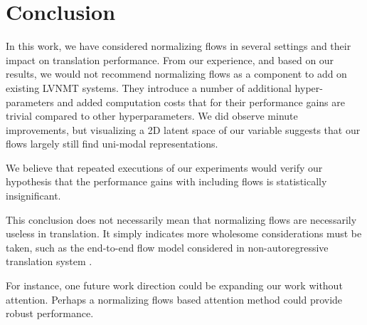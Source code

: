 \chapter{Conclusion}
In this work, we have considered normalizing flows in several settings and their impact on translation performance. From our experience, and based on our results, we would not recommend normalizing flows as a component to add on existing \ac{LVNMT} systems. They introduce a number of additional hyper-parameters and added computation costs that for their performance gains are trivial compared to other hyperparameters. We did observe minute improvements, but visualizing a 2D latent space of our variable suggests that our flows largely still find uni-modal representations.  

We believe that repeated executions of our experiments would verify our hypothesis that the performance gains with including flows is statistically insignificant. 

This conclusion does not necessarily mean that normalizing flows are necessarily useless in translation. It simply indicates more wholesome considerations must be taken, such as the end-to-end flow model considered in non-autoregressive translation system \cite{flowseq2019Xuezhe}.

For instance, one future work direction could be expanding our work without attention. Perhaps a normalizing flows based attention method could provide robust performance. 



